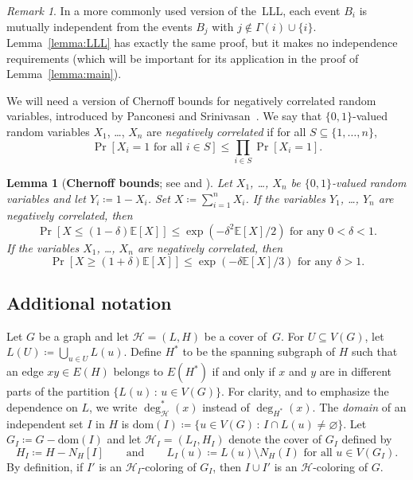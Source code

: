 \documentclass[11pt, reqno, psamsfonts]{amsart}
\newtheorem{lemma}[theo]{Lemma}
\theoremstyle{definition}
\theoremstyle{remark}
\newtheorem*{remk}{Remark}
\newcommand{\0}{\varnothing}
\newcommand{\set}[1]{\{#1\}}
\newcommand{\dom}{\mathrm{dom}}
\renewcommand{\leq}{\leqslant}
\renewcommand{\geq}{\geqslant}
\newcommand{\defeq}{\coloneqq}
\newcommand{\Cov}[1]{\mathscr{#1}}
\numberwithin{equation}{section}
\begin{document}
	\begin{remk}
		In a more commonly used version of the~LLL, each event $B_i$ is mutually independent from the events $B_j$ with $j \not\in \Gamma(i) \cup \set{i}$. Lemma~\ref{lemma:LLL} has exactly the same proof, but it makes no independence requirements (which will be important for its application in the proof of Lemma~\ref{lemma:main}).
	\end{remk}
	
	We will need a version of Chernoff bounds for negatively correlated random variables, introduced by Panconesi and Srinivasan~\cite{PS}. We say that $\set{0,1}$-valued random variables $X_1$, \ldots, $X_n$ are \emph{negatively correlated} if for all $S \subseteq \set{1, \ldots, n}$,
	\[
	\Pr\left[X_i = 1 \text{ for all } i \in S \right] \leq \prod_{i \in S} \Pr\left[X_i = 1\right].
	\]
	
	\begin{lemma}[{\textbf{Chernoff bounds}; see \cite{PS} and \cite[Lemma~3]{Mol17}}]\label{lemma:Chernoff}
		Let $X_1$, \ldots, $X_n$ be $\set{0,1}$-valued random variables and let $Y_i \defeq 1 - X_i$. Set $X \defeq \sum_{i = 1}^n X_i$. If the variables $Y_1$, \ldots, $Y_n$ are negatively correlated, then
		\[
			\Pr\left[X \leq (1 - \delta) \mathbb{E}[X]\right] \leq \exp\left(-\delta^2 \mathbb{E}[X]/2\right) \text{ for any } 0 < \delta < 1.
		\]
		If the variables $X_1$, \ldots, $X_n$ are negatively correlated, then
		\[
			\Pr\left[X \geq (1 + \delta) \mathbb{E}[X] \right] \leq \exp\left(-\delta\mathbb{E}[X]/3\right) \text{ for any } \delta > 1.
		\]
	\end{lemma}
	
	\subsection{Additional notation}\label{subsec:not}
	
	Let $G$ be a graph and let $\Cov{H} = (L,H)$ be a cover of~$G$. For $U \subseteq V(G)$, let $L(U) \defeq \bigcup_{u \in U} L(u)$. Define $H^\ast$ to be the spanning subgraph of $H$ such that an edge $xy \in E(H)$ belongs to $E(H^\ast)$ if and only if $x$ and $y$ are in different parts of the partition $\set{L(u)\,:\, u \in V(G)}$. For clarity, and to emphasize the dependence on $L$, we write $\deg^\ast_{\Cov{H}}(x)$ instead of $\deg_{H^\ast}(x)$. The \emph{domain} of an independent set $I$ in $H$ is $\dom(I) \defeq \set{u \in V(G)\,:\, I\cap L(u) \neq \0}$.  Let $G_I \defeq G - \dom(I)$ and let $\Cov{H}_I = (L_I, H_I)$ denote the cover of $G_I$ defined by
	\[
	H_I \defeq H - N_H[I] \qquad\text{and}\qquad L_I(u) \defeq L(u) \setminus N_H(I) \text{ for all } u \in V(G_I).
	\]
	By definition, if $I'$ is an $\Cov{H}_I$-coloring of $G_I$, then $I \cup I'$ is an $\Cov{H}$-coloring of $G$.
	
\end{document}
